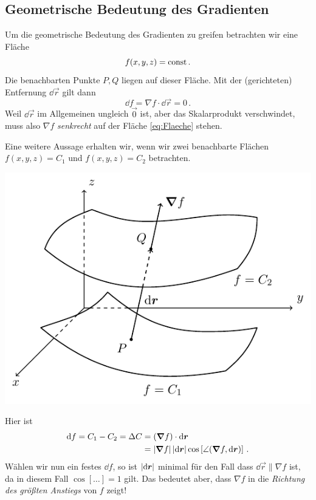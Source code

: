 \documentclass[paper=a4, fontsize=11.0pt, abstractoff, DIV12]{scrartcl}
\begin{document}
\subsection{Geometrische Bedeutung des Gradienten}

Um die geometrische Bedeutung des Gradienten zu greifen betrachten wir eine
Fläche
\begin{equation}
f(x,y,z) = \mathrm{const}\, .
\label{eq:Flaeche}
\end{equation}
Die benachbarten Punkte $P, Q$ liegen auf dieser Fläche. Mit der (gerichteten) Entfernung $\dd \vec r$ gilt dann
\begin{equation}
\dd f = \nabla f \cdot \dd \vec r = 0\,.
\end{equation}
Weil $\dd \vec r$ im Allgemeinen ungleich $\vec 0$ ist, aber das Skalarprodukt
verschwindet, muss also $\nabla f$ \emph{senkrecht} auf der Fläche
\eqref{eq:Flaeche} stehen.

Eine weitere Aussage erhalten wir, wenn wir zwei benachbarte Flächen
$f(x,y,z) = C_1$ und $f(x,y,z) = C_2$ betrachten.

\begin{center}
    \includegraphics{Figures/Grad}
\end{center}
Hier ist
\begin{align}
\dd f = C_1 - C_2 = \Delta C &= (\nabla f)\cdot \dd \vec r\nonumber\\
&=\abs{\nabla f} \abs{\dd \vec r}\cos\left[\angle(\nabla f, \dd \vec r) \right]\,.
\end{align}
Wählen wir nun ein festes $\dd f$, so ist $\left\vert \mathrm{d} {\boldsymbol{r}} \right\vert$ minimal für den
Fall dass $\dd \vec r \parallel \nabla f$ ist, da in diesem Fall $\cos[\dots]=1$ gilt. Das bedeutet aber, dass $\nabla f$ in die \emph{Richtung des größten Anstiegs} von $f$ zeigt!
\end{document}
